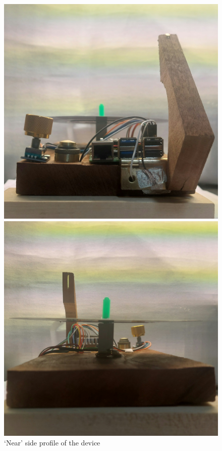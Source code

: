             \begin{figure}[H]
                \centering
                \begin{minipage}[b]{0.225\textwidth}
                    \centering
                    \includegraphics[width=\textwidth]{images/photos/profile_SIDE.jpg}
                    \caption{`Near' side profile of the device}
                    \label{fig:side1}
                \end{minipage}
                \hfill
                \begin{minipage}[b]{0.225\textwidth}
                    \centering
                    \includegraphics[width=\textwidth]{images/photos/profile_SIDE2.jpg}

\end{minipage}
\end{figure}
